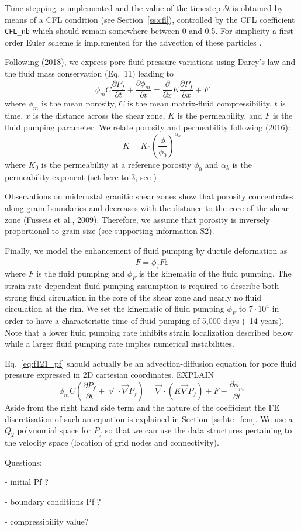 Time stepping is implemented and the value of the timestep $\delta t$ is obtained 
by means of a CFL condition (see Section~\ref{ss:cfl}), controlled by the CFL coefficient \lstinline{CFL_nb} which 
should remain somewhere between 0 and 0.5. For simplicity a first order Euler scheme is implemented 
for the advection of these particles . 

\vspace{1cm}


Following \textcite{begu18} (2018), we 
express pore fluid pressure variations using Darcy’s law and the fluid mass 
conservation \cite{grfr03}(Eq.~11) leading to 
\begin{equation}
\phi_m C \frac{\partial P_f}{\partial t}
+\frac{\partial \phi_m}{\partial t}
= 
\frac{\partial}{\partial x} K \frac{\partial P_f}{\partial x} + F
\label{eq:f121_pf}
\end{equation}
where $\phi_m$ is the mean porosity, $C$ is the mean matrix-fluid compressibility, 
$t$ is time, $x$ is the distance across the
shear zone, $K$ is the permeability, and $F$ is the fluid pumping parameter. 
We relate porosity and permeability following \textcite{skre16} (2016):
\[
K = K_0 \left( \frac{\phi}{\phi_0} \right)^{\alpha_k}
\]
where $K_0$ is the permeability at a reference porosity $\phi_0$ 
and $\alpha_k$ is the permeability exponent
(set here to 3, see \textcite{skre16})

Observations on midcrustal granitic shear zones show that porosity concentrates
along grain boundaries and decreases with the distance to the core of the 
shear zone (Fusseis et al., 2009).
Therefore, we assume that porosity is inversely proportional 
to grain size (see supporting information S2).

Finally, we model the enhancement of fluid pumping by ductile deformation as
\[
\dot{F} = \phi_f F \dot{\varepsilon}
\]
where $F$ is the fluid pumping and $\phi_F$ is the kinematic of the fluid pumping. 
The strain rate-dependent fluid pumping assumption is required to describe both strong 
fluid circulation in the core of the shear zone and nearly no fluid circulation at 
the rim. We set the kinematic of fluid pumping $\phi_F$ to $7\cdot10^4$ in order to have a 
characteristic time of fluid pumping of 5,000 days (~14 years). 
Note that a lower fluid pumping rate inhibits strain
localization described below while a larger fluid pumping rate implies numerical instabilities.


Eq.~\eqref{eq:f121_pf} should actually be an advection-diffusion equation for pore fluid 
pressure expressed in 2D cartesian coordinates. EXPLAIN
\[
\phi_m C \left( \frac{\partial P_f}{\partial t} + \vec\upnu \cdot \vec\nabla P_f \right)
=
\vec\nabla \cdot ( K \vec\nabla P_f) + F - \frac{\partial \phi_m}{\partial t}
\]
Aside from the right hand side term and the nature of the coefficient the FE 
discretisation of such an equation is explained in Section~\ref{ss:hte_fem}.
We use a $Q_2$ polynomial space for $P_f$ so that we can use the data
structures pertaining to the velocity space (location of grid nodes and connectivity).

Questions:

- initial Pf ?

- boundary conditions Pf ? 

- compressibility value?



